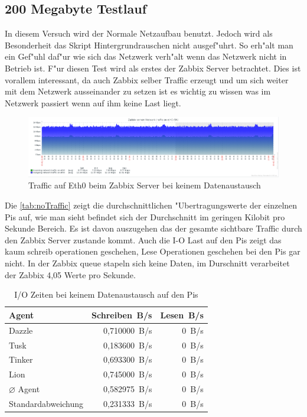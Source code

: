 \subsection{200 Megabyte Testlauf}
\label{subsec:200MBtest}
In diesem Versuch wird der Normale Netzaufbau benutzt. Jedoch wird als Besonderheit das Skript Hintergrundrauschen %
nicht ausgef"uhrt. So erh"alt man ein Gef"uhl daf"ur wie sich das Netzwerk verh"alt wenn das Netzwerk nicht in Betrieb %
ist. F"ur diesen Test wird als erstes der Zabbix Server betrachtet. Dies ist vorallem interessant, da auch Zabbix selber %
Traffic erzeugt und um sich weiter mit dem Netzwerk ausseinander zu setzen ist es wichtig zu wissen was im Netzwerk passiert %
wenn auf ihm keine Last liegt. %
 
\begin{figure}[htbp]
\centering
\includegraphics*[width=0.9\linewidth]{Abb/Zabbix/ZabbixNoTraffic/ZabbixNoTrafficEth0}

\caption{Traffic auf Eth0 beim Zabbix Server bei keinem Datenaustausch}
\label{fig:Eth0ServerNoTraffic}
\end{figure}

Die \cref{tab:noTraffic} zeigt die durchschnittlichen "Ubertragungswerte der einzelnen Pis auf, wie man sieht %
befindet sich der Durchschnitt im geringen Kilobit pro Sekunde Bereich. Es ist davon auszugehen das der gesamte %
sichtbare Traffic durch den Zabbix Server zustande kommt. Auch die I-O Last auf den Pis zeigt das kaum schreib operationen %
geschehen, Lese Operationen geschehen bei den Pis gar nicht. In der Zabbix queue stapeln sich keine Daten, im Durschnitt %
verarbeitet der Zabbix 4,05 Werte pro Sekunde. 

\begin{table}
\centering
\begin{tabular}{l%
 r<{\,B/s}%
 r<{\,B/s}%
}
Agent	  			& Schreiben	 	& Lesen	\\	
\hline
Dazzle 				& 0,710000		& 0	        \\
Tusk 				& 0,183600		& 0		\\
Tinker				& 0,693300 		& 0	 	\\
Lion				& 0,745000		& 0	 	\\
$\diameter $ Agent 		& 0,582975		& 0		\\   
Standardabweichung 		& 0,231333  		& 0		\\
\end{tabular}
\caption{I/O Zeiten bei keinem Datenaustausch auf den Pis}
\label{tab:noTrafficIoStat}
\end{table}



